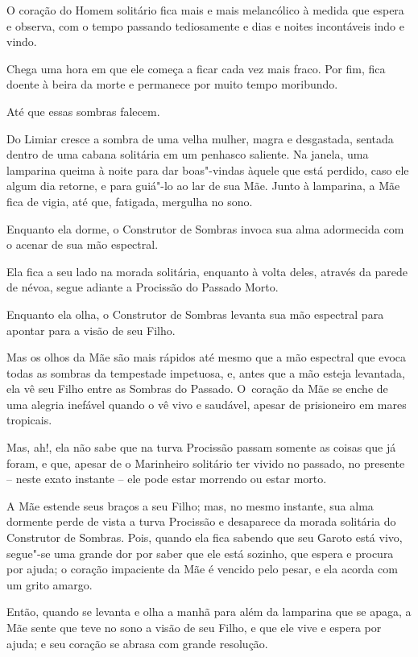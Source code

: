 O coração do Homem solitário fica mais e mais melancólico à medida que
espera e observa, com o tempo passando tediosamente e dias e noites
incontáveis indo e vindo.

\smallskip
Chega uma hora em que ele começa a ficar cada vez mais fraco. Por fim,
fica doente à beira da morte e permanece por muito tempo moribundo.

Até que essas sombras falecem.

\smallskip
Do Limiar cresce a sombra de uma velha mulher, magra e desgastada,
sentada dentro de uma cabana solitária em um penhasco saliente. Na
janela, uma lamparina queima à noite para dar boas"-vindas àquele que está
perdido, caso ele algum dia retorne, e para guiá"-lo ao lar de sua Mãe.
Junto à lamparina, a Mãe fica de vigia, até que, fatigada, mergulha no
sono.

Enquanto ela dorme, o Construtor de Sombras invoca sua alma adormecida
com o acenar de sua mão espectral.

Ela fica a seu lado na morada solitária, enquanto à volta deles, através
da parede de névoa, segue adiante a Procissão do Passado Morto.

Enquanto ela olha, o Construtor de Sombras levanta sua mão espectral
para apontar para a visão de seu Filho.

Mas os olhos da Mãe são mais rápidos até mesmo que a mão espectral que
evoca todas as sombras da tempestade impetuosa, e, antes que a mão
esteja levantada, ela vê seu Filho entre as Sombras do Passado. O~coração da Mãe se enche de uma alegria inefável quando o vê vivo e
saudável, apesar de prisioneiro em mares tropicais.

Mas, ah!, ela não sabe que na turva Procissão passam somente as coisas
que já foram, e que, apesar de o Marinheiro solitário ter vivido no
passado, no presente -- neste exato instante -- ele pode estar morrendo
ou estar morto.

A Mãe estende seus braços a seu Filho; mas, no mesmo instante, sua alma
dormente perde de vista a turva Procissão e desaparece da morada
solitária do Construtor de Sombras. Pois, quando ela fica sabendo que
seu Garoto está vivo, segue"-se uma grande dor por saber que ele está
sozinho, que espera e procura por ajuda; o coração impaciente da Mãe é
vencido pelo pesar, e ela acorda com um grito amargo.

Então, quando se levanta e olha a manhã para além da lamparina que se
apaga, a Mãe sente que teve no sono a visão de seu Filho, e que ele vive
e espera por ajuda; e seu coração se abrasa com grande resolução.

